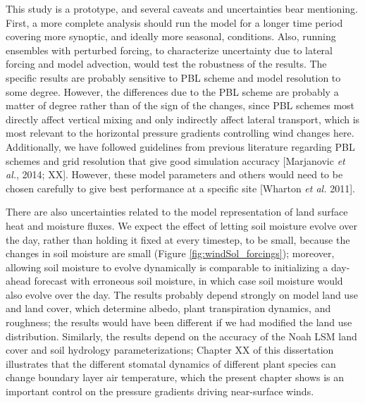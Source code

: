 This study is a prototype, and several caveats and uncertainties bear mentioning.  First, a more complete analysis should run the model for a longer time period covering more synoptic, and ideally more seasonal, conditions.  Also, running ensembles with perturbed forcing, to characterize uncertainty due to lateral forcing and model advection, would test the robustness of the results.  The specific results are probably sensitive to PBL scheme and model resolution to some degree.  However, the differences due to the PBL scheme are probably a matter of degree rather than of the sign of the changes, since PBL schemes most directly affect vertical mixing and only indirectly affect lateral transport, which is most relevant to the horizontal pressure gradients controlling wind changes here.  Additionally, we have followed guidelines from previous literature regarding PBL schemes and grid resolution that give good simulation accuracy [Marjanovic \textit{et al.}, 2014; XX].  However, these model parameters and others would need to be chosen carefully to give best performance at a specific site [Wharton \textit{et al.} 2011].

There are also uncertainties related to the model representation of land surface heat and moisture fluxes.  We expect the effect of letting soil moisture evolve over the day, rather than holding it fixed at every timestep, to be small, because the changes in soil moisture are small (Figure \ref{fig:windSol_forcings}); moreover, allowing soil moisture to evolve dynamically is comparable to initializing a day-ahead forecast with erroneous soil moisture, in which case soil moisture would also evolve over the day.  The results probably depend strongly on model land use and land cover, which determine albedo, plant transpiration dynamics, and roughness; the results would have been different if we had modified the land use distribution.  Similarly, the results depend on the accuracy of the Noah LSM land cover and soil hydrology parameterizations; Chapter XX of this dissertation illustrates that the different stomatal dynamics of different plant species can change boundary layer air temperature, which the present chapter shows is an important control on the pressure gradients driving near-surface winds.

